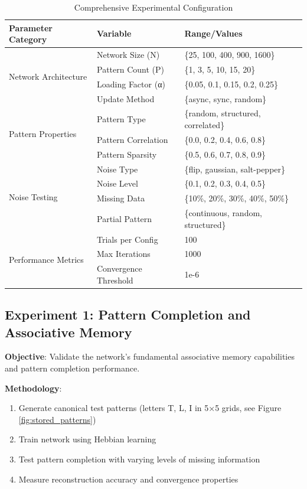 \documentclass[11pt,a4paper]{article}
\begin{document}
\begin{table}[H]
\centering
\caption{Comprehensive Experimental Configuration}
\begin{tabular}{@{}lll@{}}
\toprule
Parameter Category & Variable & Range/Values \\
\midrule
\multirow{4}{*}{Network Architecture} & Network Size (N) & \{25, 100, 400, 900, 1600\} \\
& Pattern Count (P) & \{1, 3, 5, 10, 15, 20\} \\
& Loading Factor (α) & \{0.05, 0.1, 0.15, 0.2, 0.25\} \\
& Update Method & \{async, sync, random\} \\
\midrule
\multirow{3}{*}{Pattern Properties} & Pattern Type & \{random, structured, correlated\} \\
& Pattern Correlation & \{0.0, 0.2, 0.4, 0.6, 0.8\} \\
& Pattern Sparsity & \{0.5, 0.6, 0.7, 0.8, 0.9\} \\
\midrule
\multirow{4}{*}{Noise Testing} & Noise Type & \{flip, gaussian, salt-pepper\} \\
& Noise Level & \{0.1, 0.2, 0.3, 0.4, 0.5\} \\
& Missing Data & \{10\%, 20\%, 30\%, 40\%, 50\%\} \\
& Partial Pattern & \{continuous, random, structured\} \\
\midrule
\multirow{3}{*}{Performance Metrics} & Trials per Config & 100 \\
& Max Iterations & 1000 \\
& Convergence Threshold & 1e-6 \\
\bottomrule
\end{tabular}
\label{tab:experimental_config}
\end{table}

\subsection{Experiment 1: Pattern Completion and Associative Memory}

\textbf{Objective}: Validate the network's fundamental associative memory capabilities and pattern completion performance.

\textbf{Methodology}:
\begin{enumerate}
    \item Generate canonical test patterns (letters T, L, I in 5×5 grids, see Figure \ref{fig:stored_patterns})
    \item Train network using Hebbian learning
    \item Test pattern completion with varying levels of missing information
    \item Measure reconstruction accuracy and convergence properties
\end{enumerate}
\end{document}
